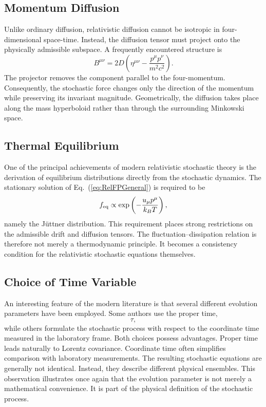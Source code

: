 \subsection{Momentum Diffusion}
Unlike ordinary diffusion,
relativistic diffusion cannot be isotropic in four-dimensional
space-time.
Instead,
the diffusion tensor must project onto the physically admissible
subspace.
A frequently encountered structure is
\begin{equation}
B^{\mu\nu}=2D\left(\eta^{\mu\nu}-\frac{p^\mu p^\nu}{m^2c^2}\right).
\label{eq:ProjectorDiffusion}
\end{equation}
The projector removes the component parallel to the four-momentum.
Consequently,
the stochastic force changes only the direction of the momentum while
preserving its invariant magnitude.
Geometrically,
the diffusion takes place along the mass hyperboloid rather than through
the surrounding Minkowski space.
\subsection{Thermal Equilibrium}
One of the principal achievements of modern relativistic stochastic
theory is the derivation of equilibrium distributions directly from the
stochastic dynamics.
The stationary solution of Eq.~(\ref{eq:RelFPGeneral}) is required to be
\begin{equation}
f_{\rm eq}\propto\exp\left(-\frac{u_\mu p^\mu}{k_BT}\right),
\end{equation}
namely the Jüttner distribution.
This requirement places strong restrictions on the admissible drift and
diffusion tensors.
The fluctuation--dissipation relation is therefore not merely a
thermodynamic principle.
It becomes a consistency condition for the relativistic stochastic
equations themselves.
\subsection{Choice of Time Variable}
An interesting feature of the modern literature is that several
different evolution parameters have been employed.
Some authors use the proper time,
\[\tau,\]
while others formulate the stochastic process with respect to the
coordinate time measured in the laboratory frame.
Both choices possess advantages.
Proper time leads naturally to Lorentz covariance.
Coordinate time often simplifies comparison with laboratory
measurements.
The resulting stochastic equations are generally not identical.
Instead,
they describe different physical ensembles.
This observation illustrates once again that the evolution parameter is
not merely a mathematical convenience.
It is part of the physical definition of the stochastic process.
